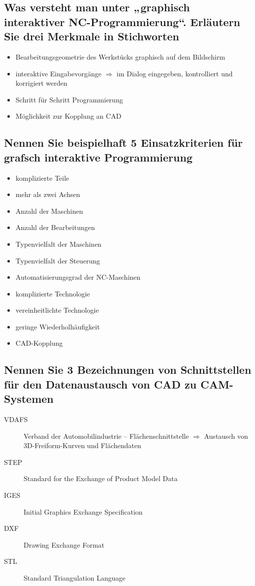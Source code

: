 \subsection*{%
    Was versteht man unter „graphisch interaktiver NC-Programmierung“. Erläutern
    Sie drei Merkmale in Stichworten
}

\begin{itemize}
    \item Bearbeitungsgeometrie des Werkstücks graphisch auf dem Bildschirm
    \item
        interaktive Eingabevorgänge $\Rightarrow$ im Dialog eingegeben,
        kontrolliert und korrigiert werden
    \item Schritt für Schritt Programmierung
    \item Möglichkeit zur Kopplung an CAD
\end{itemize}

\subsection*{%
    Nennen Sie beispielhaft 5 Einsatzkriterien für grafsch interaktive
    Programmierung
}

\begin{itemize}
    \item komplizierte Teile 
    \item mehr als zwei Achsen 
    \item Anzahl der Maschinen 
    \item Anzahl der Bearbeitungen 
    \item Typenvielfalt der Maschinen 
    \item Typenvielfalt der Steuerung 
    \item Automatisierungsgrad der NC-Maschinen 
    \item komplizierte Technologie
    \item vereinheitlichte Technologie 
    \item geringe Wiederholhäufigkeit 
    \item CAD-Kopplung
\end{itemize}

\subsection*{%
    Nennen Sie 3 Bezeichnungen von Schnittstellen für den Datenaustausch von
    CAD zu CAM-Systemen
}

\begin{description}
    \item[VDAFS]
        Verband der Automobilindustrie – Flächenschnittstelle $\Rightarrow$
        Austausch von 3D-Freiform-Kurven und Flächendaten 
    \item[STEP] Standard for the Exchange of Product Model Data 
    \item[IGES] Initial Graphics Exchange Specification 
    \item[DXF] Drawing Exchange Format 
    \item[STL] Standard Triangulation Language 
\end{description}

